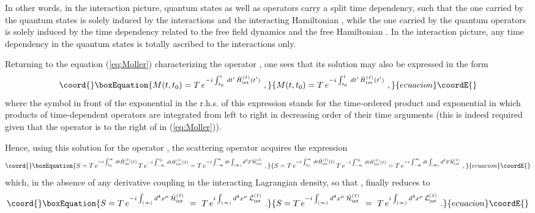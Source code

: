 \documentclass[a4paper,11pt]{article}
\begin{document}
In other words, in the interaction picture, quantum states as well as 
ope\-ra\-tors carry a split time dependency, such that the one carried by the 
quantum states is solely induced by the interactions and the interacting 
Hamiltonian \coordHE{}, while the one carried by the quantum 
operators is solely induced by the time dependency related to the free 
field dynamics and the free Hamiltonian \coordHE{}. In the interaction 
picture, any time dependency in the quantum states is totally ascribed to 
the interactions only.

Returning to the equation (\ref{eq:Moller}) characterizing the operator 
\coordHE{}, one sees that its solution may also be expressed in the form
\begin{equation}\coord{}\boxEquation{
M(t,t_0)=T\,e^{-i\int_{t_0}^t\,dt'\,\hat{H}^{(I)}_{\rm int}(t')}\ ,
}{
M(t,t_0)=T\,e^{-i\int_{t_0}^t\,dt'\,\hat{H}^{(I)}_{\rm int}(t')}\ ,
}{ecuacion}\coordE{}\end{equation}
where the symbol \coordHE{} in front of the exponential in the r.h.s. of this
expression stands for the time-ordered product and exponential in which 
products of time-dependent operators are integrated from left to right in
decreasing order of their time arguments (this is indeed required given
that the operator \coordHE{} is to the right of \coordHE{}
in (\ref{eq:Moller})). 

Hence, using this solution for the operator
\coordHE{}, the scattering ope\-ra\-tor acquires the expression
\begin{equation}\coord{}\boxEquation{
S=T\,e^{-i\int_{t_0}^\infty\,dt\hat{H}^{(I)}_{\rm int}(t)}\,
T\,e^{-i\int_{-\infty}^{t_0}\,dt\hat{H}^{(I)}_{\rm int}(t)}=
T\,e^{-i\int_{-\infty}^\infty dt\int_{(\infty)}d^3\vec{x}\,
\hat{\cal H}^{(I)}_{\rm int}}\ ,
\label{eq:ST}
}{
S=T\,e^{-i\int_{t_0}^\infty\,dt\hat{H}^{(I)}_{\rm int}(t)}\,
T\,e^{-i\int_{-\infty}^{t_0}\,dt\hat{H}^{(I)}_{\rm int}(t)}=
T\,e^{-i\int_{-\infty}^\infty dt\int_{(\infty)}d^3\vec{x}\,
\hat{\cal H}^{(I)}_{\rm int}}\ ,
}{ecuacion}\coordE{}\end{equation}
which, in the absence of any derivative coupling in the interacting Lagrangian
density, so that \coordHE{}, finally reduces to
\begin{equation}\coord{}\boxEquation{
S=T\,e^{-i\int_{(\infty)}d^4x^\mu\,\hat{\cal H}^{(I)}_{\rm int}}\ =\
T\,e^{i\int_{(\infty)}d^4x^\mu\,\hat{\cal L}^{(I)}_{\rm int}}\ .
}{
S=T\,e^{-i\int_{(\infty)}d^4x^\mu\,\hat{\cal H}^{(I)}_{\rm int}}\ =\
T\,e^{i\int_{(\infty)}d^4x^\mu\,\hat{\cal L}^{(I)}_{\rm int}}\ .
}{ecuacion}\coordE{}\end{equation}
\end{document}
